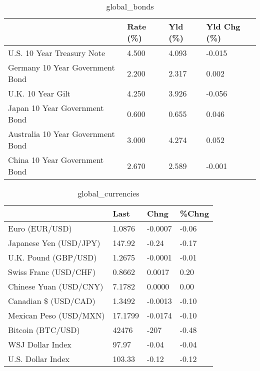 \documentclass{article}%
\begin{document}
%


\begin{table}[htbp]%
\caption{global\_bonds}%
\centering%
\begin{adjustbox}{width=1\textwidth}%
\begin{tabular}{llll}
\toprule
                                  & Rate (\%) & Yld (\%) & Yld Chg (\%) \\
\midrule
       U.S. 10 Year Treasury Note &    4.500 &   4.093 &      -0.015 \\
  Germany 10 Year Government Bond &    2.200 &   2.317 &       0.002 \\
                U.K. 10 Year Gilt &    4.250 &   3.926 &      -0.056 \\
    Japan 10 Year Government Bond &    0.600 &   0.655 &       0.046 \\
Australia 10 Year Government Bond &    3.000 &   4.274 &       0.052 \\
    China 10 Year Government Bond &    2.670 &   2.589 &      -0.001 \\
\bottomrule
\end{tabular}
%
\end{adjustbox}%
\end{table}

%


\begin{table}[htbp]%
\caption{global\_currencies}%
\centering%
\begin{adjustbox}{width=1\textwidth}%
\begin{tabular}{llll}
\toprule
                       &    Last &    Chng & \%Chng \\
\midrule
        Euro (EUR/USD) &  1.0876 & -0.0007 & -0.06 \\
Japanese Yen (USD/JPY) &  147.92 &   -0.24 & -0.17 \\
  U.K. Pound (GBP/USD) &  1.2675 & -0.0001 & -0.01 \\
 Swiss Franc (USD/CHF) &  0.8662 &  0.0017 &  0.20 \\
Chinese Yuan (USD/CNY) &  7.1782 &  0.0000 &  0.00 \\
  Canadian \$ (USD/CAD) &  1.3492 & -0.0013 & -0.10 \\
Mexican Peso (USD/MXN) & 17.1799 & -0.0174 & -0.10 \\
     Bitcoin (BTC/USD) &   42476 &    -207 & -0.48 \\
      WSJ Dollar Index &   97.97 &   -0.04 & -0.04 \\
     U.S. Dollar Index &  103.33 &   -0.12 & -0.12 \\
\bottomrule
\end{tabular}
%
\end{adjustbox}%
\end{table}
\end{document}

